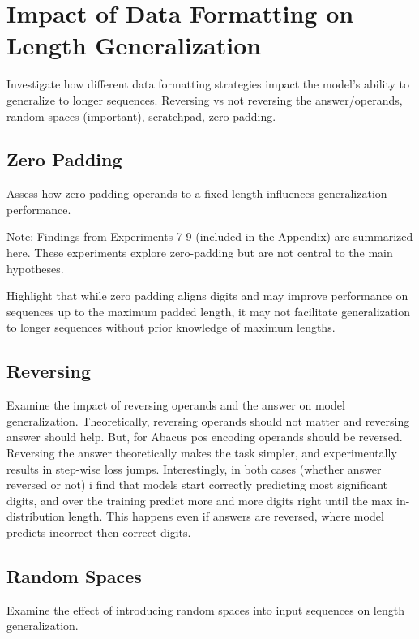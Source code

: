 \label{fig:rand_spaces_attn_maps}


\section{Impact of Data Formatting on Length Generalization}\label{sec:data_formatting_improvement}
Investigate how different data formatting strategies impact the model's ability to generalize to longer sequences. Reversing vs not reversing the answer/operands, random spaces (important), scratchpad, zero padding.


\subsection{Zero Padding}
Assess how zero-padding operands to a fixed length influences generalization performance.

Note: Findings from Experiments 7-9 (included in the Appendix) are summarized here. These experiments explore zero-padding but are not central to the main hypotheses.

Highlight that while zero padding aligns digits and may improve performance on sequences up to the maximum padded length, it may not facilitate generalization to longer sequences without prior knowledge of maximum lengths.


\subsection{Reversing}
Examine the impact of reversing operands and the answer on model generalization. Theoretically, reversing operands should not matter and reversing answer should help. But, for Abacus pos encoding operands should be reversed. Reversing the answer theoretically makes the task simpler, and experimentally results in step-wise loss jumps. Interestingly, in both cases (whether answer reversed or not) i find that models start correctly predicting most significant digits, and over the training predict more and more digits right until the max in-distribution length. This happens even if answers are reversed, where model predicts incorrect then correct digits.


\subsection{Random Spaces}
Examine the effect of introducing random spaces into input sequences on length generalization.

